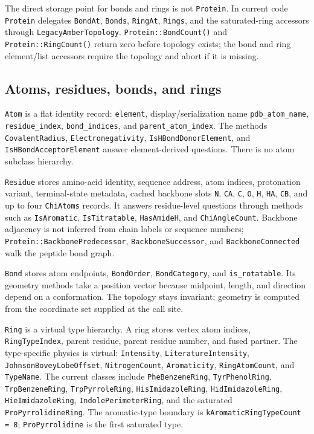 \documentclass[11pt]{article}
\newcommand{\code}[1]{\texttt{#1}}
\begin{document}
The direct storage point for bonds and rings is not \code{Protein}. In current
code \code{Protein} delegates \code{BondAt}, \code{Bonds},
\code{RingAt}, \code{Rings}, and the saturated-ring accessors through
\code{LegacyAmberTopology}. \code{Protein::BondCount()} and
\code{Protein::RingCount()} return zero before topology exists; the bond and
ring element/list accessors require the topology and abort if it is missing.

\subsection{Atoms, residues, bonds, and rings}

\code{Atom} is a flat identity record:
\code{element}, display/serialization name \code{pdb\_atom\_name},
\code{residue\_index}, \code{bond\_indices}, and
\code{parent\_atom\_index}. The methods \code{CovalentRadius},
\code{Electronegativity}, \code{IsHBondDonorElement}, and
\code{IsHBondAcceptorElement} answer element-derived questions. There is no
atom subclass hierarchy.

\code{Residue} stores amino-acid identity, sequence address, atom indices,
protonation variant, terminal-state metadata, cached backbone slots
\code{N}, \code{CA}, \code{C}, \code{O}, \code{H}, \code{HA},
\code{CB}, and up to four \code{ChiAtoms} records. It answers residue-level
questions through methods such as \code{IsAromatic}, \code{IsTitratable},
\code{HasAmideH}, and \code{ChiAngleCount}. Backbone adjacency is not inferred
from chain labels or sequence numbers; \code{Protein::BackbonePredecessor},
\code{BackboneSuccessor}, and \code{BackboneConnected} walk the peptide bond
graph.

\code{Bond} stores atom endpoints, \code{BondOrder}, \code{BondCategory}, and
\code{is\_rotatable}. Its geometry methods take a position vector because
midpoint, length, and direction depend on a conformation. The topology stays
invariant; geometry is computed from the coordinate set supplied at the call
site.

\code{Ring} is a virtual type hierarchy. A ring stores vertex atom indices,
\code{RingTypeIndex}, parent residue, parent residue number, and fused partner.
The type-specific physics is virtual: \code{Intensity},
\code{LiteratureIntensity}, \code{JohnsonBoveyLobeOffset},
\code{NitrogenCount}, \code{Aromaticity}, \code{RingAtomCount}, and
\code{TypeName}. The current classes include \code{PheBenzeneRing},
\code{TyrPhenolRing}, \code{TrpBenzeneRing}, \code{TrpPyrroleRing},
\code{HisImidazoleRing}, \code{HidImidazoleRing}, \code{HieImidazoleRing},
\code{IndolePerimeterRing}, and the saturated
\code{ProPyrrolidineRing}. The aromatic-type boundary is
\code{kAromaticRingTypeCount = 8}; \code{ProPyrrolidine} is the first
saturated type.
\end{document}

